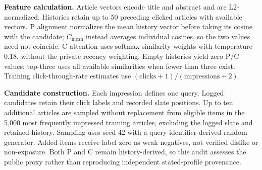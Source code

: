\noindent\textbf{Feature calculation.} Article vectors encode title and abstract and are L2-normalized. Histories retain up to 50 preceding clicked articles with available vectors. P alignment normalizes the mean history vector before taking its cosine with the candidate; $C_{\mathrm{mean}}$ instead averages individual cosines, so the two values need not coincide. C attention uses softmax similarity weights with temperature 0.18, without the private recency weighting. Empty histories yield zero P/C values; top-three uses all available similarities when fewer than three exist. Training click-through-rate estimates use $(\mathrm{clicks}+1)/(\mathrm{impressions}+2)$.

\noindent\textbf{Candidate construction.} Each impression defines one query. Logged candidates retain their click labels and recorded slate positions. Up to ten additional articles are sampled without replacement from eligible items in the 5,000 most frequently impressed training articles, excluding the logged slate and retained history. Sampling uses seed 42 with a query-identifier-derived random generator. Added items receive label zero as weak negatives, not verified dislike or non-exposure. Both P and C remain history-derived, so this audit assesses the public proxy rather than reproducing independent stated-profile provenance.
